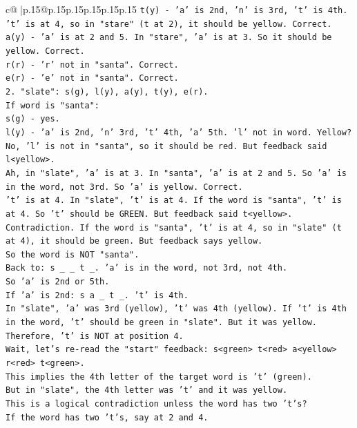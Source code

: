 \documentclass{article}
\begin{document}
{\begin{supertabular}{c@{$\;$}|p{.15\linewidth}@{}p{.15\linewidth}p{.15\linewidth}p{.15\linewidth}p{.15\linewidth}p{.15\linewidth}}
{{{\texttt{t(y) {-} 'a' is 2nd, 'n' is 3rd, 't' is 4th. 't' is at 4, so in "stare" (t at 2), it should be yellow. Correct.} \\
\texttt{a(y) {-} 'a' is at 2 and 5. In "stare", 'a' is at 3. So it should be yellow. Correct.} \\
\texttt{r(r) {-} 'r' not in "santa". Correct.} \\
\texttt{e(r) {-} 'e' not in "santa". Correct.} \\
\texttt{2. "slate": s(g), l(y), a(y), t(y), e(r).} \\
\texttt{If word is "santa":} \\
\texttt{s(g) {-} yes.} \\
\texttt{l(y) {-} 'a' is 2nd, 'n' 3rd, 't' 4th, 'a' 5th. 'l' not in word. Yellow? No, 'l' is not in "santa", so it should be red. But feedback said l<yellow>.} \\
\texttt{Ah, in "slate", 'a' is at 3. In "santa", 'a' is at 2 and 5. So 'a' is in the word, not 3rd. So 'a' is yellow. Correct.} \\
\texttt{'t' is at 4. In "slate", 't' is at 4. If the word is "santa", 't' is at 4. So 't' should be GREEN. But feedback said t<yellow>.} \\
\texttt{Contradiction. If the word is "santa", 't' is at 4, so in "slate" (t at 4), it should be green. But feedback says yellow.} \\
\texttt{So the word is NOT "santa".} \\
\texttt{Back to: s \_ \_ t \_. 'a' is in the word, not 3rd, not 4th.} \\
\texttt{So 'a' is 2nd or 5th.} \\
\texttt{If 'a' is 2nd: s a \_ t \_. 't' is 4th.} \\
\texttt{In "slate", 'a' was 3rd (yellow), 't' was 4th (yellow). If 't' is 4th in the word, 't' should be green in "slate". But it was yellow.} \\
\texttt{Therefore, 't' is NOT at position 4.} \\
\texttt{Wait, let's re{-}read the "start" feedback: s<green> t<red> a<yellow> r<red> t<green>.} \\
\texttt{This implies the 4th letter of the target word is 't' (green).} \\
\texttt{But in "slate", the 4th letter was 't' and it was yellow.} \\
\texttt{This is a logical contradiction unless the word has two 't's?} \\
\texttt{If the word has two 't's, say at 2 and 4.} \\
}}}
\end{supertabular}}
\end{document}
